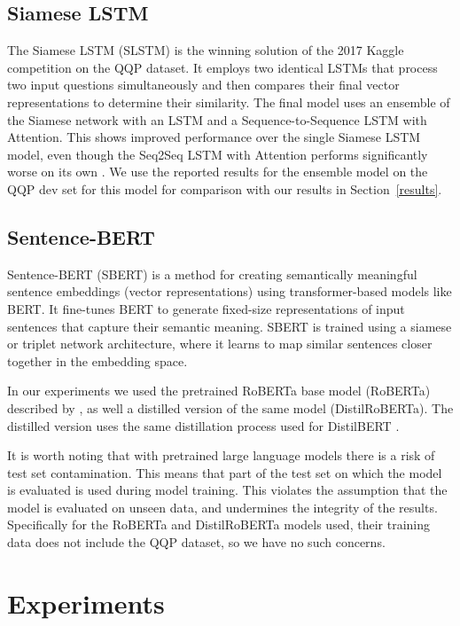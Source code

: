 \documentclass[10pt, a4paper]{article}
\begin{document}
\subsection{Siamese LSTM} \label{siamese-lstm}

The Siamese LSTM (SLSTM) is the winning solution of the 2017 Kaggle competition on the QQP dataset.
It employs two identical LSTMs that process two input questions simultaneously and then compares their final vector representations to determine their similarity.
The final model uses an ensemble of the Siamese network with an LSTM and a Sequence-to-Sequence LSTM with Attention.
This shows improved performance over the single Siamese LSTM model, even though the Seq2Seq LSTM with Attention performs significantly worse on its own \citep{dadashov2017quora}.
We use the reported results for the ensemble model on the QQP dev set for this model for comparison with our results in Section~\ref{results}.

\subsection{Sentence-BERT}

Sentence-BERT (SBERT) is a method for creating semantically meaningful sentence embeddings (vector representations) using transformer-based models like BERT. It fine-tunes BERT to generate fixed-size representations of input sentences that capture their semantic meaning. SBERT is trained using a siamese or triplet network architecture, where it learns to map similar sentences closer together in the embedding space.

In our experiments we used the pretrained RoBERTa base model (RoBERTa) described by \citet{liu2019roberta}, as well a distilled version of the same model (DistilRoBERTa). The distilled version uses the same distillation process used for DistilBERT \cite{sanh2019distilbert}.

It is worth noting that with pretrained large language models there is a risk of test set contamination.
This means that part of the test set on which the model is evaluated is used during model training. This violates the assumption that the model is evaluated on unseen data, and undermines the integrity of the results.
Specifically for the RoBERTa and DistilRoBERTa models used, their training data does not include the QQP dataset, so we have no such concerns.

\section{Experiments}
\end{document}
